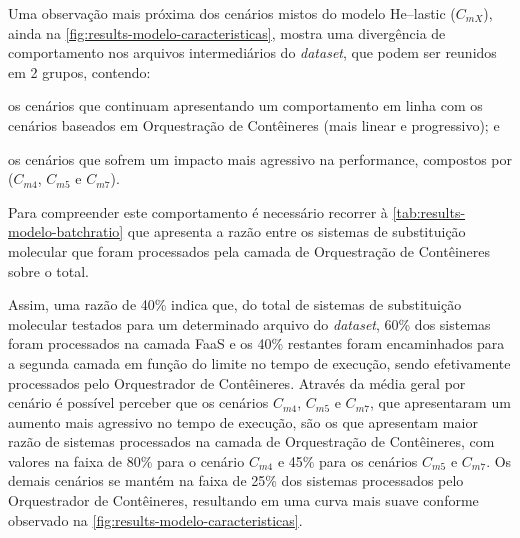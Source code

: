 \documentclass[english,brazilian]{UNISINOSmonografia} %
\begin{document}
Uma observação mais próxima dos cenários mistos do modelo \textsf{He}--lastic ($C_{mX}$), ainda na \autoref{fig:results-modelo-caracteristicas}, mostra uma divergência de comportamento nos arquivos intermediários do \textit{dataset}, que podem ser reunidos em 2 grupos, contendo:
\begin{inparaenum} 
	\item os cenários que continuam apresentando um comportamento em linha com os cenários baseados em Orquestração de Contêineres (mais linear e progressivo); e
	\item os cenários que sofrem um impacto mais agressivo na performance, compostos por ($C_{m4}$, $C_{m5}$ e $C_{m7}$).
\end{inparaenum}
%
Para compreender este comportamento é necessário recorrer à \autoref{tab:results-modelo-batchratio} que apresenta a razão entre os sistemas de substituição molecular que foram processados pela camada de Orquestração de Contêineres sobre o total.



Assim, uma razão de 40\% indica que, do total de sistemas de substituição molecular testados para um determinado arquivo do \textit{dataset}, 60\% dos sistemas foram processados na camada FaaS e os 40\% restantes foram encaminhados para a segunda camada em função do limite no tempo de execução, sendo efetivamente processados pelo Orquestrador de Contêineres.
%
Através da média geral por cenário é possível perceber que os cenários $C_{m4}$, $C_{m5}$ e $C_{m7}$, que apresentaram um aumento mais agressivo no tempo de execução, são os que apresentam maior razão de sistemas processados na camada de Orquestração de Contêineres, com valores na faixa de 80\% para o cenário $C_{m4}$ e 45\% para os cenários $C_{m5}$ e $C_{m7}$.
Os demais cenários se mantém na faixa de 25\% dos sistemas processados pelo Orquestrador de Contêineres, resultando em uma curva mais suave conforme observado na \autoref{fig:results-modelo-caracteristicas}.
\end{document}
